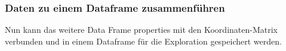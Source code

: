\documentclass[
]{article}
\newenvironment{Shaded}{\begin{snugshade}}{\end{snugshade}}
\newcommand{\FunctionTok}[1]{\textcolor[rgb]{0.13,0.29,0.53}{\textbf{#1}}}
\newcommand{\NormalTok}[1]{#1}
\newcommand{\OtherTok}[1]{\textcolor[rgb]{0.56,0.35,0.01}{#1}}
\newcommand{\SpecialCharTok}[1]{\textcolor[rgb]{0.81,0.36,0.00}{\textbf{#1}}}
\begin{document}
\hypertarget{daten-zu-einem-dataframe-zusammenfuxfchren}{%
\subsubsection{Daten zu einem Dataframe
zusammenführen}\label{daten-zu-einem-dataframe-zusammenfuxfchren}}

Nun kann das weitere Data Frame properties mit den Koordinaten-Matrix
verbunden und in einem Dataframe für die Exploration gespeichert werden.

\begin{Shaded}
\end{Shaded}
\end{document}
